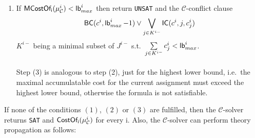 \documentclass{amsart}
\theoremstyle{definition}
\theoremstyle{remark}
\numberwithin{equation}{section}
\def\C{$\mathcal{C}$}
\def\sat{\texttt{SAT}}
\def\unsat{\texttt{UNSAT}}
\begin{document}
\begin{enumerate}
      \item If $\operatorname{\sf MCostOf_i \rm}(\mu_{\mathcal{C}}^i) < \operatorname{\sf lb \rm}_{max}^i$ then return \unsat{} and the \C{}-conflict clause
      \begin{equation*}
        \operatorname{\sf BC \rm}(c^i, \operatorname{\sf lb \rm}_{max}^i - 1) \vee \bigvee\limits_{j \in K^{i-}} \operatorname{\sf IC \rm}(c^i, j, c^i_j)
      \end{equation*}
      $K^{i-}$ being a minimal subset of $J^{i-}$ s.t.\ $\sum\limits_{j \in K^{i-}} c^i_j < \operatorname{\sf lb \rm}_{max}^i$. \\\\
      Step (3) is analogous to step (2), just for the highest lower bound, i.e.\ the maximal accumulatable cost for the current assignment must exceed the highest lower bound, otherwise the formula is not satisfiable. \\

    \end{enumerate}
    If none of the conditions $(1)$, $(2)$ or $(3)$ are fulfilled, then the \C{}-solver returns \sat{} and $\operatorname{\sf CostOf_i \rm}(\mu_{\mathcal{C}}^i)$ for every i. Also, the \C{}-solver can perform theory propagation as follows:
\end{document}
